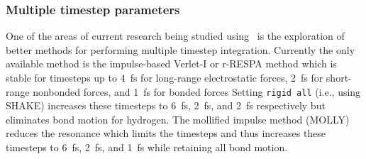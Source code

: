 \subsubsection{Multiple timestep parameters}

One of the areas of current research being studied using \NAMD\ is the
exploration of better methods for performing multiple timestep integration.
Currently the only available method is the impulse-based Verlet-I or r-RESPA
method which is stable for timesteps up to 4~fs for long-range electrostatic
forces, 2~fs for short-range nonbonded forces, and 1~fs for bonded forces
Setting {\tt rigid all} (i.e., using SHAKE) increases these timesteps to
6~fs, 2~fs, and 2~fs respectively but eliminates bond motion for hydrogen.
The mollified impulse method (MOLLY) reduces the resonance which limits
the timesteps and thus increases these timesteps to 6~fs, 2~fs, and 1~fs
while retaining all bond motion.

